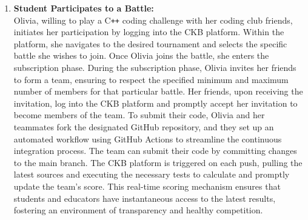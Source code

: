 \begin{enumerate}

    \item \textbf{Student Participates to a Battle:} \\
    Olivia, willing to play a C\texttt{++} coding challenge with her coding club friends, initiates her participation by logging into the CKB platform. Within the platform, she navigates to the desired tournament and selects the specific battle she wishes to join. Once Olivia joins the battle, she enters the subscription phase.
During the subscription phase, Olivia invites her friends to form a team, ensuring to respect the specified minimum and maximum number of members for that particular battle. Her friends, upon receiving the invitation, log into the CKB platform and promptly accept her invitation to become members of the team.
To submit their code, Olivia and her teammates fork the designated GitHub repository, and they set up an automated workflow using GitHub Actions to streamline the continuous integration process. The team can submit their code by committing changes to the main branch.
The CKB platform is triggered on each push, pulling the latest sources and executing the necessary tests to calculate and promptly update the team's score. This real-time scoring mechanism ensures that students and educators have instantaneous access to the latest results, fostering an environment of transparency and healthy competition.
    

\end{enumerate}
